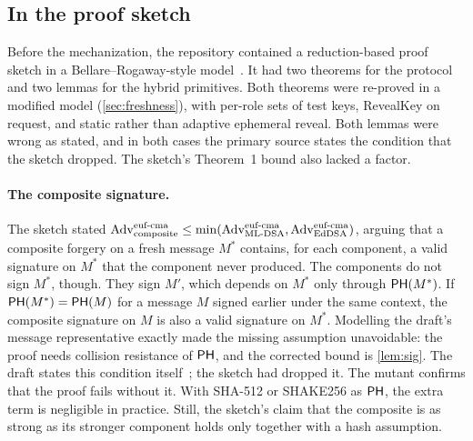 \subsection{In the proof sketch}\label{sec:sketchcaught}

Before the mechanization, the repository contained a reduction-based proof
sketch in a Bellare--Rogaway-style model~\cite{BR93,CK01}. It had two
theorems for the protocol and two lemmas for the hybrid primitives. Both
theorems were re-proved in a modified model (\cref{sec:freshness}), with
per-role sets of test keys, RevealKey on request, and static rather than
adaptive ephemeral reveal. Both lemmas were wrong as stated, and in both
cases the primary source states the condition that the sketch dropped. The
sketch's Theorem~1 bound also lacked a factor.

\paragraph{The composite signature.} The sketch stated
$\mathrm{Adv}^{\text{euf-cma}}_{\text{composite}} \le \min(\mathrm{Adv}^{\text{euf-cma}}_{\text{ML-DSA}}, \mathrm{Adv}^{\text{euf-cma}}_{\text{EdDSA}})$,
arguing that a composite forgery on a fresh message $M^*$ contains, for each
component, a valid signature on $M^*$ that the component never produced. The
components do not sign $M^*$, though. They sign $M'$, which depends on $M^*$
only through $\mathsf{PH}(M^*)$. If $\mathsf{PH}(M^*) = \mathsf{PH}(M)$ for a message $M$ signed
earlier under the same context, the composite signature on $M$ is also a
valid signature on $M^*$. Modelling the draft's message representative
exactly made the missing assumption unavoidable: the proof needs collision
resistance of $\mathsf{PH}$, and the corrected bound is \cref{lem:sig}. The draft
states this condition itself~\cite[\S1.3]{Composite}; the sketch had dropped
it. The mutant  confirms that
the proof fails without it. With SHA-512 or SHAKE256 as $\mathsf{PH}$, the extra term
is negligible in practice. Still, the sketch's claim that the composite is as
strong as its stronger component holds only together with a hash
assumption.

